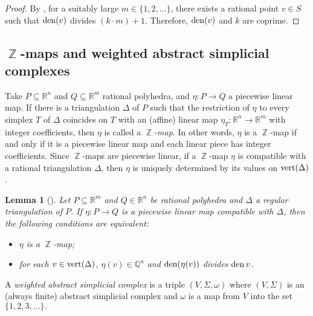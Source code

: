 \documentclass[reqno, draft]{amsart}
\newtheorem{lemma}[theorem]{Lemma}
\theoremstyle{definition}
\begin{document}
\begin{proof}
By \cite[Lemma~3.4]{CM2013}, for a suitably large $m\in\{1,2,\ldots\}$, 
there exists a rational point $v\in S$ 
such that $\operatorname{{\rm den}}(v)$ divides $(k\cdot m)+1$. 
Therefore, $\operatorname{{\rm den}}(v)$ and $k$ are coprime.
\end{proof}

\subsection{$\operatorname{\mathbb{Z}}$-maps and weighted abstract simplicial complexes}
Take $P\subseteq {\mathbb{R}}^{n}$ and $Q\subseteq{\mathbb{R}}^m$ rational polyhedra, 
and  $\eta\colon P\rightarrow Q$ a piecewise linear map.
If there is a  triangulation $\Delta$  of $P$
such that the restriction of $\eta$ to every simplex $T$  
of  $\Delta$ coincides on $T$
with an (affine) linear map 
$\eta_{T}\colon {\mathbb{R}}^{n}\rightarrow {\mathbb{R}}^{m}$ with integer coefficients, 
then $\eta$ is called a {\it $\operatorname{\mathbb{Z}}$-map}. 
In other words, $\eta$ is a $\operatorname{\mathbb{Z}}$-map if and only if 
it is a piecewise linear map 
and each linear piece has integer coefficients. 
Since $\operatorname{\mathbb{Z}}$-maps are piecewise linear, 
if a $\operatorname{\mathbb{Z}}$-map $\eta$ is compatible
 with a rational triangulation $\Delta$, 
then $\eta$ is uniquely determined by its values on $\operatorname{{\rm vert}}(\Delta)$. 

\begin{lemma}[{\cite[Lemma~3.7]{Mu2011}}]\label{Lem-LinearMap}
Let $P\subseteq {\mathbb{R}}^{m}$  and $Q\in{\mathbb{R}}^n$ be rational polyhedra 
and $\Delta$ a regular triangulation of $P$.
If $\eta\colon P\to Q$ is a piecewise linear map 
compatible with $\Delta$, 
then the following conditions are equivalent:
\begin{itemize}
\item[(i)] $\eta$ is a $\operatorname{\mathbb{Z}}$-map;
\item[(ii)] for each $v\in \operatorname{{\rm vert}}(\Delta)$, 
	$\eta(v)\in{\mathbb{Q}}^n$ and $\operatorname{{\rm den}}(\eta(v))$ divides $\operatorname{{\rm den}}{v}$.
\end{itemize}
\end{lemma}

A {\it weighted abstract simplicial complex} 
is a triple $(V,\Sigma, \omega)$
where $(V,\Sigma)$ is an (always finite) abstract simplicial complex
and $\omega$ is a map from $V$ into the set $\{1,2,3,\ldots\}.$
\end{document}
